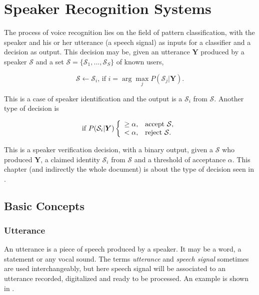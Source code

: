 \chapter{Speaker Recognition Systems}
\label{ch:speaker-recognition-system}

The process of voice recognition lies on the field of pattern classification, with the speaker and his or her utterance (a speech signal) as inputs for a classifier and a decision as output. This decision may be, given an utterance $\boldsymbol{Y}$ produced by a speaker $\mathcal{S}$ and a set $\boldsymbol{\mathcal{S}} = \{\mathcal{S}_1, ..., \mathcal{S}_S\}$ of known users,

\begin{equation}
    \mathcal{S} \gets \mathcal{S}_i \text{, if } i = \arg\max_j P(\mathcal{S}_j|\boldsymbol{Y}).
    \label{eq:decision_speaker_identification}
\end{equation}

\noindent This is a case of speaker identification and the output is a $\mathcal{S}_i$ from $\boldsymbol{\mathcal{S}}$. Another type of decision is

\begin{equation}
    \text{if } P(\mathcal{S}_i|\boldsymbol{Y}) \verifytest{\alpha}{\mathcal{S}}
    \label{eq:decision_speaker_verification}
\end{equation}

\noindent This is a speaker verification decision, with a binary output, given a $\mathcal{S}$ who produced $\boldsymbol{Y}$, a claimed identity $\mathcal{S}_i$ from $\boldsymbol{\mathcal{S}}$ and a threshold of acceptance $\alpha$. This chapter (and indirectly the whole document) is about the type of decision seen in .

\section{Basic Concepts}

\subsection{Utterance}

An utterance is a piece of speech produced by a speaker. It may be a word, a statement or any vocal sound. The terms \emph{utterance} and \emph{speech signal} sometimes are used interchangeably, but here speech signal will be associated to an utterance recorded, digitalized and ready to be processed. An example is shown in .


